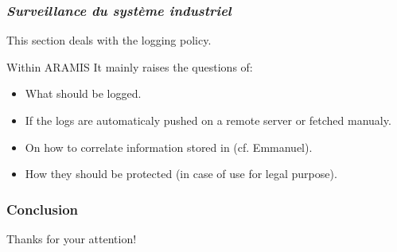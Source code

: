 \documentclass{beamer}
\begin{document}
\begin{frame}
    \frametitle{{\em Surveillance du syst\`eme industriel}}

    This section deals with the logging policy.
    \vfill
    \begin{block}{Within ARAMIS}
        It mainly raises the questions of:
        \begin{itemize}
            \item What should be logged.
            \item If the logs are automaticaly pushed on a remote server or fetched manualy.
            \item On how to correlate information stored in (cf. Emmanuel).
            \item How they should be protected (in case of use for legal purpose).
        \end{itemize}
    \end{block}
\end{frame}

\begin{frame}
    \frametitle{Conclusion}

    \begin{center}
        Thanks for your attention!
    \end{center}
\end{frame}
\end{document}
